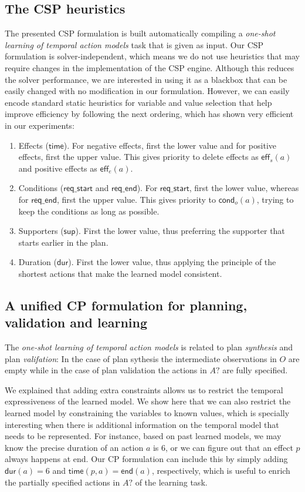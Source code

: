 \documentclass{ecai}
\newcommand{\eff}{\mathsf{eff}}    %
\newcommand{\cond}{\mathsf{cond}}  %
\newcommand{\dur}{\mathsf{dur}}    %
\newcommand{\en}{\mathsf{end}}     %
\newcommand{\supp}{\mathsf{sup}}   %
\newcommand{\tim}{\mathsf{time}}   %
\newcommand{\reqs}{\mathsf{req\_{start}}} %
\newcommand{\reqe}{\mathsf{req\_{end}}}   %
\begin{document}
\subsection{The CSP heuristics}
\label{sec:implementation}
The presented CSP formulation is built automatically compiling a {\em one-shot learning of temporal action models} task that is given as input. Our CSP formulation is solver-independent, which means we do not use heuristics that may require changes in the implementation of the CSP engine. Although this reduces the solver performance, we are interested in using it as a blackbox that can be easily changed with no modification in our formulation. However, we can easily encode standard static heuristics for variable and value selection that help improve efficiency by following the next ordering, which has shown very efficient in our experiments:

\begin{enumerate}
  \item Effects ($\tim$). For negative effects, first the lower value and for positive effects, first the upper value. This gives priority to delete effects as $\eff_s(a)$ and positive effects as $\eff_e(a)$.
  \item Conditions ($\reqs$ and $\reqe$). For $\reqs$, first the lower value, whereas for $\reqe$, first the upper value. This gives priority to $\cond_o(a)$, trying to keep the conditions as long as possible.
  \item Supporters ($\supp$). First the lower value, thus preferring the supporter that starts earlier in the plan.
  \item Duration ($\dur$). First the lower value, thus applying the principle of the shortest actions that make the learned model consistent.
\end{enumerate}


\subsection{A unified CP formulation for planning, validation and learning}
\label{sec:usingCPValidation}
The {\em one-shot learning of temporal action models} is related to plan {\em synthesis} and plan {\em valifation}: In the case of plan sythesis the intermediate observations in $O$ are empty while in the case of plan validation the actions in $A?$ are fully specified.

We explained that adding extra constraints allows us to restrict the temporal expressiveness of the learned model. We show here that we can also restrict the learned model by constraining the variables to known values, which is specially interesting when there is additional information on the temporal model that needs to be represented. For instance, based on past learned models, we may know the precise duration of an action $a$ is 6,
or we can figure out that an effect $p$ always happens at end.
Our CP formulation can include this by simply adding $\dur(a)=6$ and $\tim(p,a)=\en(a)$, respectively, which is useful to enrich the partially specified actions in $A?$ of the learning task.
\end{document}
